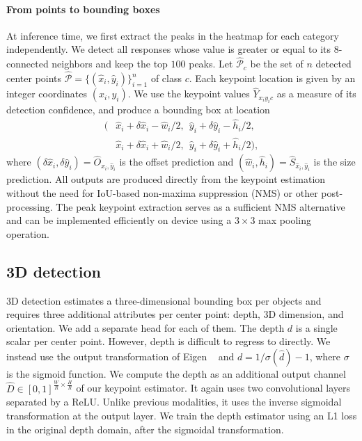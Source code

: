 \documentclass[10pt,twocolumn,letterpaper]{article}
\begin{document}
\paragraph{From points to bounding boxes}
At inference time, we first extract the peaks in the heatmap for each category independently.
We detect all responses whose value is greater or equal to its 8-connected neighbors and keep the top $100$ peaks.
Let $\hat{\mathcal{P}}_c$ be the set of $n$ detected center points $\hat{\mathcal{P}} = \{(\hat x_i, \hat y_i)\}_{i = 1}^{n}$ of class $c$.
Each keypoint location is given by an integer coordinates $(x_i,y_i)$.
We use the keypoint values $\hat Y_{x_iy_ic}$ as a measure of its detection confidence, and produce a bounding box at location
\begin{align*}
 (&\hat x_i + \delta \hat x_i - \hat w_i / 2,\ \ \hat y_i + \delta \hat y_i - \hat h_i / 2,\\
 &\hat x_i + \delta \hat x_i + \hat w_i / 2,\ \ \hat y_i + \delta \hat y_i + \hat h_i / 2),
\end{align*}
where $(\delta \hat x_i, \delta \hat y_i) = \hat O_{\hat x_i,\hat y_i}$ is the offset prediction and $(\hat w_i,\hat h_i) = \hat S_{\hat x_i,\hat y_i}$ is the size prediction.
All outputs are produced directly from the keypoint estimation without the need for IoU-based non-maxima suppression (NMS) or other post-processing.
The peak keypoint extraction serves as a sufficient NMS alternative and can be implemented efficiently on device using a $3 \times 3$ max pooling operation.

\subsection{3D detection}

3D detection estimates a three-dimensional bounding box per objects and requires three additional attributes per center point: depth, 3D dimension, and orientation.
We add a separate head for each of them.
The depth $d$ is a single scalar per center point.
However, depth is difficult to regress to directly.
We instead use the output transformation of Eigen \etal~\cite{eigen2014depth} and $d = 1 / \sigma(\hat d) - 1$, where $\sigma$ is the sigmoid function.
We compute the depth as an additional output channel $\hat D \in [0,1]^{\frac{W}{R} \times \frac{H}{R}}$ of our keypoint estimator.
It again uses two convolutional layers separated by a ReLU.
Unlike previous modalities, it uses the inverse sigmoidal transformation at the output layer.
We train the depth estimator using an L1 loss in the original depth domain, after the sigmoidal transformation.
\end{document}
